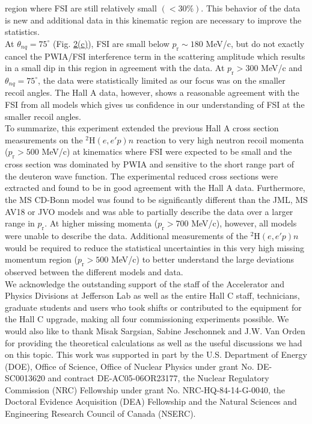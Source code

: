 region where FSI are still relatively small $(<30\%)$. This behavior of the data is new and additional data in this kinematic region are necessary
to improve the statistics. \\
\indent At $\theta_{nq}=75^{\circ}$ (Fig. \hyperref[fig:fig2]{2(c)}), FSI are small below $p_{\mathrm{r}}\sim180$ MeV/c, but do not exactly cancel the PWIA/FSI interference term in the scattering amplitude which results in a small dip in this region in agreement with the data.
At $p_{\mathrm{r}}>300$ MeV/c and $\theta_{nq}=75^{\circ}$, the data were statistically limited as our focus was on the smaller recoil angles. The Hall A data, however, shows a reasonable agreement with the FSI from all models which gives us confidence in our understanding
of FSI at the smaller recoil angles. \\
\indent To summarize, this experiment extended the previous Hall A cross section measurements on the $^{2}\mathrm{H}(e,e'p)n$ reaction to 
very high neutron recoil momenta ($p_{\mathrm{r}}>500$ MeV/c) at kinematics where FSI were expected to be small and the cross section was dominated by PWIA and sensitive to the
short range part of the deuteron wave function. The experimental reduced cross sections were extracted and found to be in good agreement with the Hall A data.
Furthermore, the MS CD-Bonn model was found to be significantly different than the JML, MS AV18 or JVO models and was able to partially describe the data over a larger range in $p_{\mathrm{r}}$.
At higher missing momenta ($p_{\mathrm{r}}>700$ MeV/c), however, all models were unable to describe the data. 
Additional measurements of the $^{2}\mathrm{H}(e,e'p)n$ would be required to reduce the statistical uncertainties in this very high missing
momentum region ($p_{\mathrm{r}}>500$ MeV/c) to better understand the large deviations observed between the different models and data.\\
\indent We acknowledge the outstanding support of the staff of the Accelerator and Physics Divisions at Jefferson Lab
as well as the entire Hall C staff, technicians, graduate students and users who took shifts or contributed
to the equipment for the Hall C upgrade, making all four commissioning experiments possible. We would also like to
thank Misak Sargsian\DIFaddbegin {}\DIFaddend , Sabine Jeschonnek and J.W. Van Orden for providing the theoretical calculations as well as the useful
discussions we had on this topic. This work was supported in part by the U.S. Department of Energy (DOE), Office of Science, Office of Nuclear Physics
under grant No. DE-SC0013620 and contract DE-AC05-06OR23177, the Nuclear Regulatory Commission (NRC) Fellowship
under grant No. NRC-HQ-84-14-G-0040, the Doctoral Evidence Acquisition (DEA) Fellowship and the Natural Sciences and Engineering Research Council of Canada (NSERC).

